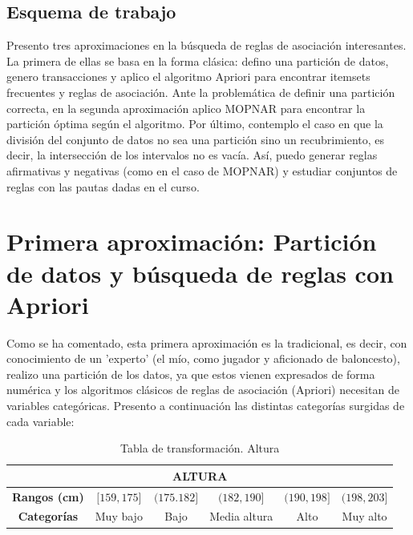 \subsection{Esquema de trabajo}

Presento tres aproximaciones en la búsqueda de reglas de asociación interesantes. La primera de ellas se basa en la forma clásica: defino una partición de datos, genero transacciones y aplico el algoritmo Apriori para encontrar itemsets frecuentes y reglas de asociación. Ante la problemática de definir una partición correcta, en la segunda aproximación aplico MOPNAR para encontrar la partición óptima según el algoritmo. Por último, contemplo el caso en que la división del conjunto de datos no sea una partición sino un recubrimiento, es decir, la intersección de los intervalos no es vacía. Así, puedo generar reglas afirmativas y negativas (como en el caso de MOPNAR) y estudiar conjuntos de reglas con las pautas dadas en el curso. 

\section{Primera aproximación: Partición de datos y búsqueda de reglas con Apriori}

Como se ha comentado, esta primera aproximación es la tradicional, es decir, con conocimiento de un 'experto' (el mío, como jugador y aficionado de baloncesto), realizo una partición de los datos, ya que estos vienen expresados de forma numérica y los algoritmos clásicos de reglas de asociación (Apriori) necesitan de variables categóricas. Presento a continuación las distintas categorías surgidas de cada variable:

\begin{table}[H]
	\centering
	\begin{tabular}{|c|c|c|c|c|c|}
		\hline
		\multicolumn{6}{|c|}{\textbf{ALTURA}}                                                         \\ \hline
		\textbf{Rangos (cm)} & ${[}159,175{]}$ & $(175.182{]}$ & $(182,190{]}$  & $(190,198{]}$ & $(198,203{]}$ \\ \hline
		\textbf{Categorías}  & Muy bajo      & Bajo        & Media altura & Alto        & Muy alto    \\ \hline
	\end{tabular}
	\caption{Tabla de transformación. Altura}
\end{table}

